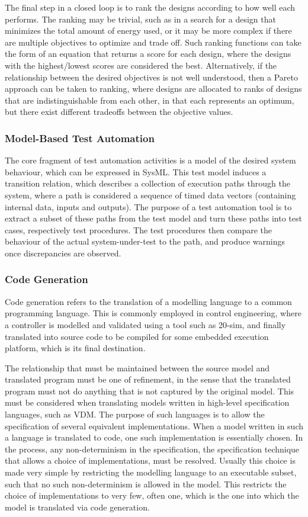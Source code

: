 The final step in a closed loop is to rank the designs according to how well each performs.
The ranking may be trivial, such as in a search for a design that minimizes the total amount of energy used, or it may be more complex if there are multiple objectives to optimize and trade off.
Such ranking functions can take the form of an equation that returns a score for each design, where the designs with the highest/lowest scores are considered the best.
Alternatively, if the relationship between the desired objectives is not well understood, then a Pareto approach can be taken to ranking, where designs are allocated to ranks of designs that are indistinguishable from each other, in that each represents an optimum, but there exist different tradeoffs between the objective values.

\subsubsection{Model-Based Test Automation}
\label{sec:concepts:mbta}
The core fragment of test automation activities is a model of the desired system behaviour, which can be expressed in SysML.
This test model induces a transition relation, which describes a collection of execution paths through the system, where a path is considered a sequence of timed data vectors (containing internal data, inputs and outputs).
The purpose of a test automation tool is to extract a subset of these paths from the test model and turn these paths into test
cases, respectively test procedures.
The test procedures then compare the behaviour of the actual system-under-test to the path, and produce warnings once discrepancies are observed.

\subsubsection{Code Generation}
\label{sec:concepts:codegen}
Code generation refers to the translation of a modelling language to a common programming language.
This is commonly employed in control engineering, where a controller is modelled and validated using a tool such as 20-sim, and finally translated into source code to be compiled for some embedded execution platform, which is its final destination.

The relationship that must be maintained between the source model and translated program must be one of refinement, in the sense that the translated program must not do anything that is not captured by the original model.
This must be considered when translating models written in high-level specification languages, such as VDM.
The purpose of such languages is to allow the specification of several equivalent implementations.
When a model written in such a language is translated to code, one such implementation is essentially chosen.
In the process, any non-determinism in the specification, the specification technique that allows a choice of implementations, must be resolved.
Usually this choice is made very simple by restricting the modelling language to an executable subset, such that no such non-determinism is allowed in the model.
This restricts the choice of implementations to very few, often one, which is the one into which the model is translated via code generation.

